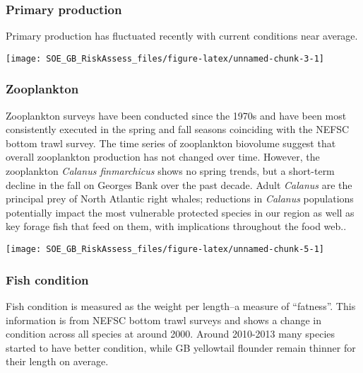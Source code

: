\documentclass[11pt,]{article}
\let\origfigure\figure
\let\endorigfigure\endfigure
\renewenvironment{figure}[1][2] {
    \expandafter\origfigure\expandafter[H]
} {
    \endorigfigure
}
\begin{document}
\subsubsection{Primary production}\label{primary-production}

Primary production has fluctuated recently with current conditions near
average.

\begin{figure}

{\centering \texttt{[image: SOE\_GB\_RiskAssess\_files/figure-latex/unnamed-chunk-3-1]} 

}

\caption{Primary production--Georges Bank\label{pp}}\label{fig:unnamed-chunk-3}
\end{figure}

\subsubsection{Zooplankton}\label{zooplankton}

Zooplankton surveys have been conducted since the 1970s and have been
most consistently executed in the spring and fall seasons coinciding
with the NEFSC bottom trawl survey. The time series of zooplankton
biovolume suggest that overall zooplankton production has not changed
over time. However, the zooplankton \emph{Calanus finmarchicus} shows no
spring trends, but a short-term decline in the fall on Georges Bank over
the past decade. Adult \emph{Calanus} are the principal prey of North
Atlantic right whales; reductions in \emph{Calanus} populations
potentially impact the most vulnerable protected species in our region
as well as key forage fish that feed on them, with implications
throughout the food web..

\begin{figure}

{\centering \texttt{[image: SOE\_GB\_RiskAssess\_files/figure-latex/unnamed-chunk-5-1]} 

}

\caption{A: GB Calanus finmarchicus spring, B: GB Calanus finmarchicus fall \label{Cfin}}\label{fig:unnamed-chunk-5}
\end{figure}

\subsubsection{Fish condition}\label{fish-condition}

Fish condition is measured as the weight per length--a measure of
``fatness''. This information is from NEFSC bottom trawl surveys and
shows a change in condition across all species at around 2000. Around
2010-2013 many species started to have better condition, while GB
yellowtail flounder remain thinner for their length on average.\\
\end{document}

